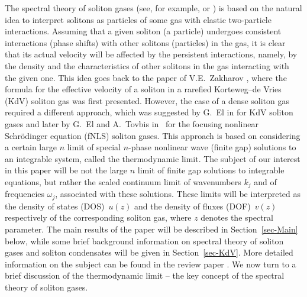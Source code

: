 \documentclass[10pt,a4paper]{amsart}
\numberwithin{equation}{section}
\renewcommand{\o}{\omega}
\def\o{\omega}
\begin{document}
The spectral theory of soliton gases (see, for example, \cite{ET2020} or \cite[Section~3]{ElRew1}) is based on the natural idea to interpret solitons as particles of some gas with elastic two-particle interactions. Assuming that a given soliton (a particle) undergoes consistent interactions (phase shifts) with other solitons (particles) in the gas, it is clear that its actual velocity will be affected by the persistent interactions, namely, by the density and the characteristics of other solitons in the gas interacting with the given one. This idea goes back to the paper of V.E.~Zakharov \cite{Za71}, where the formula for the effective velocity of a soliton in a rarefied Korteweg--de Vries (KdV) soliton gas was first presented. However, the case of a dense soliton gas required a different approach, which was suggested by G.~El in \cite{El2003} for KdV soliton gases and later by G.~El and A.~Tovbis in~\cite{ET2020} for the focusing nonlinear Schr\"odinger equation (fNLS)
soliton gases. This approach is based on considering a certain large $n$ limit of special $n$-phase nonlinear wave (finite gap) solutions to an integrable system, called the thermodynamic limit. The subject of our interest in this paper will be not the large $n$ limit of finite gap solutions to integrable equations, but rather the scaled continuum limit of wavenumbers $k_j$ and of frequencies $\o_j$, associated with these solutions. These limits will be interpreted as the density of states (DOS)~$u(z)$ and the density of fluxes (DOF)~$v(z)$ respectively of the corresponding soliton gas, where $z$ denotes the spectral parameter. The main results of the paper will be described in Section~\ref{sec-Main} below, while some brief background information on spectral theory of soliton gases and soliton condensates will be given in Section~\ref{sec-KdV}.
	More detailed information on the subject can be found in the review paper \cite{ElRew1}. We now turn to a brief discussion of the thermodynamic limit -- the key concept of the spectral theory of soliton gases.
\end{document}
